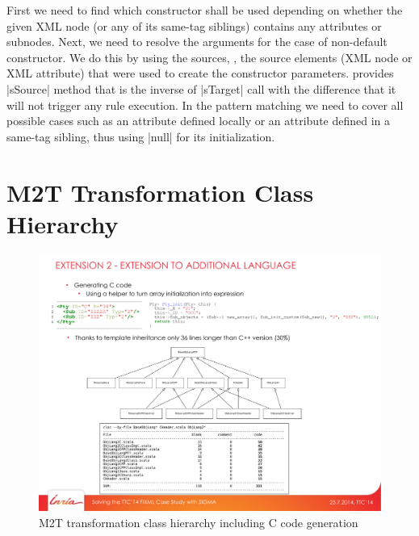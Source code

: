 First we need to find which constructor shall be used depending on whether the given XML node (or any of its same-tag siblings) contains any attributes or subnodes.
Next, we need to resolve the arguments for the case of non-default constructor.
We do this by using the sources, \Ie, the source elements (XML node or XML attribute) that were used to create the constructor parameters.
\SIGMA provides \Scala|sSource| method that is the inverse of \Scala|sTarget| call with the difference that it will not trigger any rule execution.
In the pattern matching we need to cover all possible cases such as an attribute defined locally or an attribute defined in a same-tag sibling, thus using \Scala|null| for its initialization.


\section{M2T Transformation Class Hierarchy}
\label{sec:AppendixM2TClassHierarchy}

\begin{figure}[h!bt]
  \centering
  \includegraphics[width=\textwidth]{figures/M2TClassHierarchy.pdf}
  \caption{M2T transformation class hierarchy including C code generation}
  \label{fig:AppendixM2TClassHierarchy}
\end{figure}

